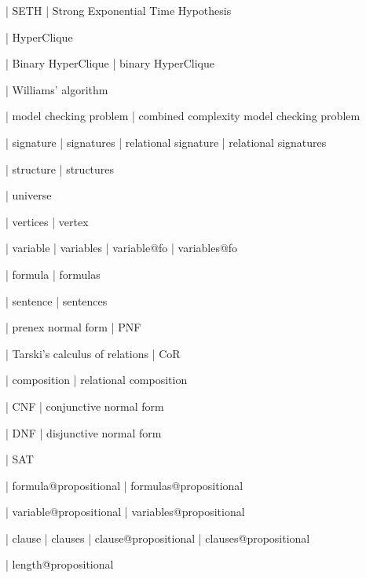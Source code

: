 | SETH
| Strong Exponential Time Hypothesis

| HyperClique

| Binary HyperClique
| binary HyperClique

| Williams' algorithm

%
%
| model checking problem
| combined complexity model checking problem

| signature
| signatures
| relational signature
| relational signatures

| structure
| structures

| universe

| vertices
| vertex

| variable
| variables
| variable@fo
| variables@fo

| formula
| formulas

| sentence
| sentences

| prenex normal form
| PNF

%
% 
| Tarski's calculus of relations
| CoR

| composition
| relational composition

%
%
| CNF
| conjunctive normal form

| DNF
| disjunctive normal form

| SAT

 | formula@propositional
 | formulas@propositional

 | variable@propositional
 | variables@propositional

 | clause
 | clauses
 | clause@propositional
 | clauses@propositional

 | length@propositional
